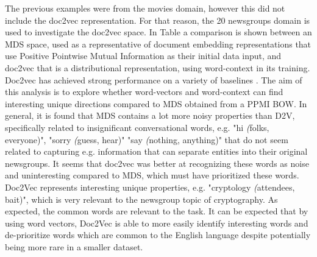 The previous examples were from the movies domain, however this did not include the doc2vec representation. For that reason, the 20 newsgroups domain is used to investigate the doc2vec space. In Table \label{ch3:compared2vmds} a comparison is shown between an MDS space, used as a representative of document embedding representations that use Positive Pointwise Mutual Information as their initial data input, and doc2vec that is a distributional representation, using word-context in its training. Doc2vec has achieved strong performance on a variety of baselines \cite{Taddy2015}. The aim of this analysis is to explore whether  word-vectors and word-context can find interesting unique directions compared to MDS obtained from a PPMI BOW. In general, it is found that MDS contains a lot more noisy properties than D2V, specifically related to insignificant conversational words, e.g. "hi \textit({folks, everyone)}", "sorry \textit({guess, hear)}" "say \textit({nothing, anything)}" that do not seem related to capturing e.g. information that can separate entities into their original newsgroups. It seems that doc2vec was better at recognizing these words as noise and uninteresting compared to MDS, which must have prioritized these words. Doc2Vec represents interesting unique properties, e.g. "cryptology \textit({attendees, bait)}", which is very relevant to the  newsgroup topic of cryptography. As expected, the common words are relevant to the task. It can be expected that by using word vectors, Doc2Vec is able to more easily identify interesting words and de-prioritize words which are common to the English language despite potentially being more rare in a smaller dataset.

